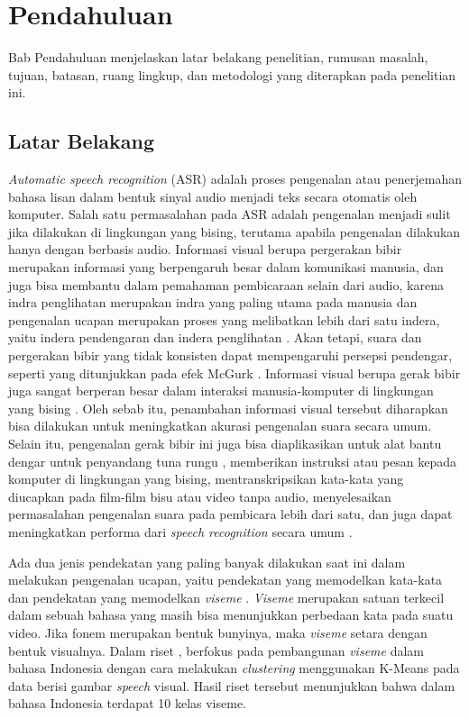 \chapter{Pendahuluan}

Bab Pendahuluan menjelaskan latar belakang penelitian, rumusan masalah, tujuan, batasan, ruang lingkup, dan metodologi yang diterapkan pada penelitian ini.


\section{Latar Belakang}

\textit{Automatic speech recognition} (ASR) adalah proses pengenalan atau penerjemahan bahasa lisan dalam bentuk sinyal audio menjadi teks secara otomatis oleh komputer. Salah satu permasalahan pada ASR adalah pengenalan menjadi sulit jika dilakukan di lingkungan yang bising, terutama apabila pengenalan dilakukan hanya dengan berbasis audio. Informasi visual berupa pergerakan bibir merupakan informasi yang berpengaruh besar dalam komunikasi manusia, dan juga bisa membantu dalam pemahaman pembicaraan selain dari audio, karena indra penglihatan merupakan indra yang paling utama pada manusia dan pengenalan ucapan merupakan proses yang melibatkan lebih dari satu indera, yaitu indera pendengaran dan indera penglihatan \parencite{Calvert2004}. Akan tetapi, suara dan pergerakan bibir yang tidak konsisten dapat mempengaruhi persepsi pendengar, seperti yang ditunjukkan pada efek McGurk \parencite{McGurk1976}. Informasi visual berupa gerak bibir juga sangat berperan besar dalam interaksi manusia-komputer di lingkungan yang bising \parencite{Garg2016}. Oleh sebab itu, penambahan informasi visual tersebut diharapkan bisa dilakukan untuk meningkatkan akurasi pengenalan suara secara umum. Selain itu, pengenalan gerak bibir ini juga bisa diaplikasikan untuk alat bantu dengar untuk penyandang tuna rungu \parencite{Garg2016}, memberikan instruksi atau pesan kepada komputer di lingkungan yang bising, mentranskripsikan kata-kata yang diucapkan pada film-film bisu atau video tanpa audio, menyelesaikan permasalahan pengenalan suara pada pembicara lebih dari satu, dan juga dapat meningkatkan performa dari \textit{speech recognition} secara umum \parencite{Chung2017}.
\bigskip

Ada dua jenis pendekatan yang paling banyak dilakukan saat ini dalam melakukan pengenalan ucapan, yaitu pendekatan yang memodelkan kata-kata \parencite{Wand2016} dan pendekatan yang memodelkan \textit{viseme} \parencite{Chung2017}. \textit{Viseme} merupakan satuan terkecil dalam sebuah bahasa yang masih bisa menunjukkan perbedaan kata pada suatu video. Jika fonem merupakan bentuk bunyinya, maka \textit{viseme} setara dengan bentuk visualnya. Dalam riset \textcite{Arifin2013}, berfokus pada pembangunan \textit{viseme} dalam bahasa Indonesia dengan cara melakukan \textit{clustering} menggunakan K-Means pada data berisi gambar \textit{speech} visual. Hasil riset tersebut menunjukkan bahwa dalam bahasa Indonesia terdapat 10 kelas viseme.
\bigskip

